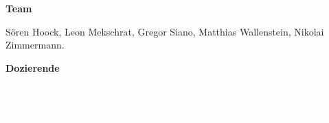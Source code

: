 \documentclass[%
textcolor=HDA_lightblue,	%
pagecolor=radacc_darkblue,		%
]{../estposter}
\begin{document}
\begin{textblock}{12.5}
\par\medskip

\color{HDA_gray_0}
\textbf{Team}
\par\smallskip

\color{HDA_lightblue}
Sören Hoock, Leon Mekschrat, Gregor Siano, Matthias Wallenstein, Nikolai Zimmermann.


\par\smallskip


\color{HDA_gray_0}
\textbf{Dozierende}
\par\smallskip

\color{HDA_lightblue}
\textcolor{white}{Prof. Dr. Elke Hergenröther}

\color{HDA_lightblue}
\textcolor{white}{Prof. Dr. Jens-Peter Akelbein}
\par\smallskip

\par\medskip


%

\par\bigskip
\par\bigskip
\par\bigskip





\end{textblock}
\end{document}
